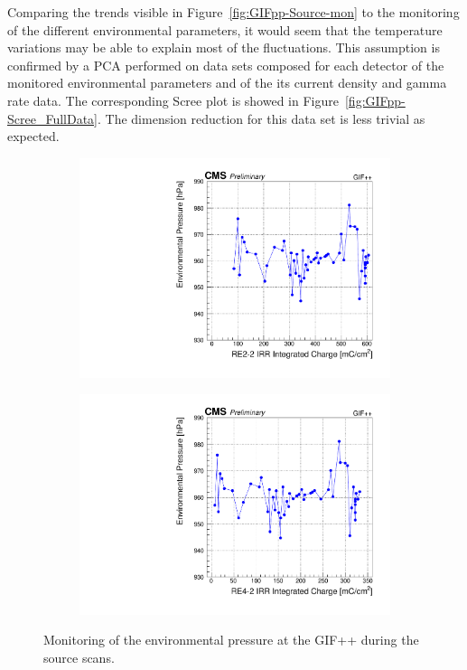 	Comparing the trends visible in Figure~\ref{fig:GIFpp-Source-mon} to the monitoring of the different environmental parameters, it would seem that the temperature variations may be able to explain most of the fluctuations. This assumption is confirmed by a PCA performed on data sets composed for each detector of the monitored environmental parameters and of the its current density and gamma rate data. The corresponding Scree plot is showed in Figure~\ref{fig:GIFpp-Scree_FullData}. The dimension reduction for this data set is less trivial as expected.

	\begin{figure}[H]
    	\begin{subfigure}{0.5\linewidth}
    		\centering
			\includegraphics[width = \linewidth]{fig/chapt5/RE2-2-Pressure-monitoring.pdf}
        	\caption{\label{fig:GIFpp-Pressure:A}}
    	\end{subfigure}
    	\begin{subfigure}{0.5\linewidth}
			\centering
    		\includegraphics[width = \linewidth]{fig/chapt5/RE4-2-Pressure-monitoring.pdf}
        	\caption{\label{fig:GIFpp-Pressure:B}}
    	\end{subfigure}
		\caption{\label{fig:GIFpp-Pressure} Monitoring of the environmental pressure at the GIF++ during the source scans.}
	\end{figure}
	
